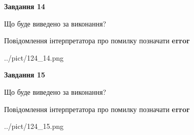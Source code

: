 \documentclass[11pt, ukrainian]{article}
\begin{document}
{\begin {large}
{\begin {center}\textbf{Завдання 14}\end {center}}\par
Що буде виведено за виконання? \par
Повідомлення інтерпретатора про помилку позначати \textbf{error}

\begin{center}
	{../pict/124_14.png}
\end{center}
\newpage

{\begin {center}\textbf{Завдання 15}\end {center}}\par
Що буде виведено за виконання? \par
Повідомлення інтерпретатора про помилку позначати \textbf{error}

\begin{center}
	{../pict/124_15.png}
\end{center}
\newpage

\end {large}}
\end{document}

